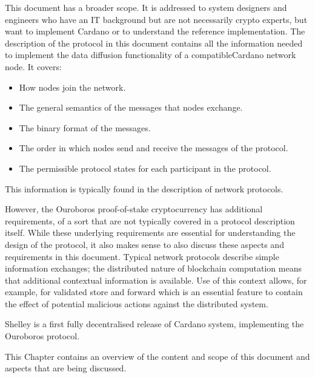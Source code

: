 \documentclass{report}
\newcommand{\wip}[1]{}
\newcommand{\wip}[1]{\color{magenta}{#1}\color{black}}
\theoremstyle{definition}{
  \newtheorem{lemma}{Lemma}[section] %
  \newtheorem{definition}[lemma]{Definition}
}
\theoremstyle{theorem}{
  \newtheorem{invariant}[lemma]{Invariant}
  \newtheorem{proofobligation}[lemma]{Proof Obligation}
}
\numberwithin{equation}{lemma}
\begin{document}
This document has a broader scope.
It is addressed to system designers and engineers who have an IT background
but are not necessarily crypto experts,
but want to implement Cardano or to understand the reference implementation.
The description of the protocol in this document contains all the information needed to
implement the data diffusion functionality of a compatibleCardano network node.
It covers:
\begin{itemize}
\item How nodes join the network.
\item The general semantics of the messages that nodes exchange.
\item The binary format of the messages.
\item The order in which nodes send and receive the messages of the protocol.
\item The permissible protocol states for each participant in the protocol.
\end{itemize}
This information is typically found in the description of network protocols.

However, the Ouroboros proof-of-stake cryptocurrency has additional requirements,
of a sort that are not typically covered in a
protocol  description itself.
While these underlying requirements are essential for understanding the design of the protocol,
it also makes sense to also discuss these aspects and requirements in this document.
Typical network protocols describe simple information exchanges;
the distributed nature of blockchain computation means
that additional contextual information is available.
Use of this context allows, for example, for validated store and forward
which is an essential feature to contain the effect of potential malicious actions
against the distributed system.

Shelley is a first fully decentralised release of Cardano system, implementing the Ouroboros protocol.

This Chapter contains an overview of the content and scope of this document and aspects that
are being discussed.

\wip{
\subsubsection{Software assurance}
Software assurance
}
\end{document}

